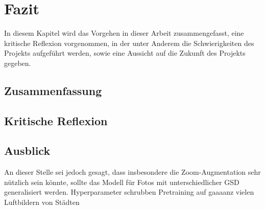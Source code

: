 \chapter{Fazit}

In diesem Kapitel wird das Vorgehen in dieser Arbeit zusammengefasst, eine kritische Reflexion vorgenommen, in der unter Anderem die Schwierigkeiten des Projekts aufgeführt werden, sowie eine Aussicht auf die Zukunft des Projekts gegeben. 

\section{Zusammenfassung}


\section{Kritische Reflexion}


\section{Ausblick}

An dieser Stelle sei jedoch gesagt, dass insbesondere die Zoom-Augmentation sehr nützlich sein könnte, 
sollte das Modell für Fotos mit unterschiedlicher \ac{GSD} generalisiert werden. 
Hyperparameter schrubben
Pretraining auf gaaaanz vielen Luftbildern von Städten